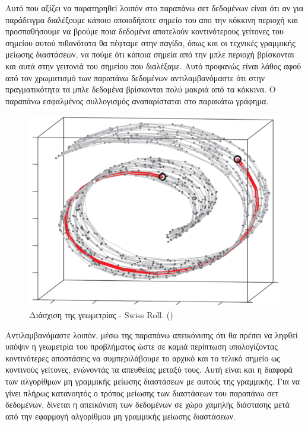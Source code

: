 \vspace{1.0cm}
\par
Αυτό που αξίζει να παρατηρηθεί λοιπόν στο παραπάνω σετ δεδομένων είναι ότι αν για παράδειγμα διαλέξουμε κάποιο οποιοδήποτε σημείο του απο την κόκκινη περιοχή και προσπαθήσουμε να βρούμε ποια δεδομένα αποτελούν κοντινότερους γείτονες του σημείου αυτού πιθανότατα θα πέφταμε στην παγίδα, όπως και οι τεχνικές γραμμικής μείωσης διαστάσεων, να πούμε ότι κάποια σημεία από την μπλε περιοχή βρίσκονται και αυτά στην γειτονιά του σημείου που διαλέξαμε. Αυτό προφανώς είναι λάθος αφού από τον χρωματισμό των παραπάνω δεδομένων αντιλαμβανόμαστε ότι στην πραγματικότητα τα μπλε δεδομένα βρίσκονται πολύ μακριά από τα κόκκινα. Ο παραπάνω εσφαλμένος συλλογισμός αναπαρίσταται στο παρακάτω γράφημα.
\par
\begin{figure}[h!]
\centering
\includegraphics[scale=0.5]{figs/3.png}
\newline
\caption{Διάσχιση της γεωμετρίας - \textlatin{Swiss Roll}. (\textlatin{\cite{isomap}})} 
\end{figure}
\par
\vspace*{2cm}
Αντιλαμβανόμαστε λοιπόν, μέσω της παραπάνω απεικόνισης ότι θα πρέπει να ληφθεί υπόψιν η γεωμετρία του προβλήματος ώστε σε καμιά περίπτωση υπολογίζοντας κοντινότερες αποστάσεις να συμπεριλάβουμε το αρχικό και το τελικό σημείο ως κοντινούς γείτονες, ενώνοντάς τα απευθείας μεταξύ τους. Αυτή είναι και η διαφορά των αλγορίθμων μη γραμμικής μείωσης διαστάσεων με αυτούς της γραμμικής. Για να γίνει πλήρως κατανοητός ο τρόπος μείωσης των διαστάσεων του παραπάνω σετ δεδομένων, δίνεται η απεικόνιση των δεδομένων σε χώρο χαμηλής διάστασης μετά από την εφαρμογή αλγορίθμου μη γραμμικής μείωσης διαστάσεων.
